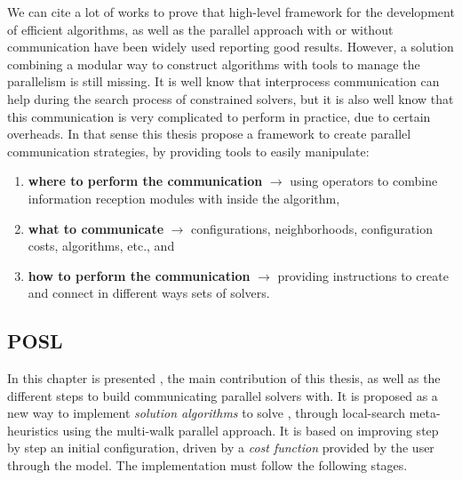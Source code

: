 
We can cite a lot of works to prove that high-level framework for the development of efficient algorithms, as well as the parallel approach with or without communication have been widely used reporting good results. However, a solution combining a modular way to construct algorithms with tools to manage the parallelism is still missing. It is well know that interprocess communication can help during the search process of constrained solvers, but it is also well know that this communication is very complicated to perform in practice, due to certain overheads. In that sense this thesis propose a framework to create parallel communication strategies, by providing tools to easily manipulate:
\begin{enumerate}
\item \textbf{where to perform the communication} $\rightarrow$ using operators to combine information reception modules with \cms{} inside the algorithm, 
\item \textbf{what to communicate} $\rightarrow$ configurations, neighborhoods, configuration costs, algorithms, etc., and
\item \textbf{how to perform the communication} $\rightarrow$ providing instructions to create and connect in different ways sets of solvers.
\end{enumerate}


\subsection{POSL}

In this chapter is presented \posl{}, the main contribution of this thesis, as well as the different steps to build communicating parallel solvers with. It is proposed as a new way to implement \textit{solution algorithms} to solve \CSPs, through local-search meta-heuristics using the multi-walk parallel approach. It is based on improving step by step an initial configuration, driven by a \textit{cost function} provided by the user through the model. The implementation must follow the following stages.


